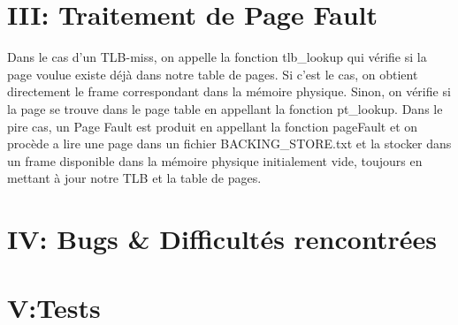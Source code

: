 \documentclass{article}
\begin{document}
\section*{III: Traitement de Page Fault}
Dans le cas d'un TLB-miss, on appelle la fonction tlb\_lookup qui vérifie si la page voulue existe déjà dans notre table de pages. Si c'est le cas, on obtient directement le frame correspondant dans la mémoire physique. Sinon, on vérifie si la page se trouve dans le page table en appellant la fonction pt\_lookup. Dans le pire cas, un Page Fault est produit en appellant la fonction pageFault et on procède a lire une page dans un fichier BACKING\_STORE.txt et la stocker dans un frame disponible dans la mémoire physique initialement vide, toujours en mettant à jour notre TLB et la table de pages.


\section*{IV: Bugs \&	 Difficultés rencontrées}

\section*{V:Tests}
\end{document}
